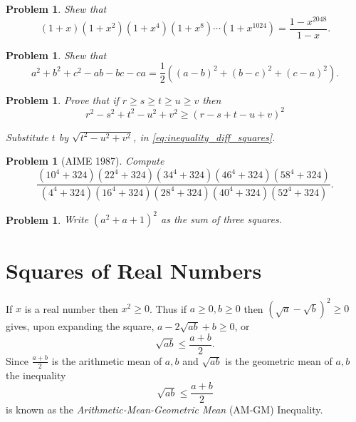 \documentclass[11pt, openany]{book}
\theoremstyle{change} \theoremheaderfont{\blue\sffamily\bfseries}
\newtheorem{pro}[thm]{Problem}
\theoremstyle{nonumberplain} \theoremheaderfont{\sffamily\bfseries}
\newcommand{\dis}{\displaystyle}
\newcommand{\í}{\'{\i}}
\begin{document}
\begin{multicols}{2}
\begin{pro} Shew that
$$(1 + x)(1 + x^2)(1 + x^4 )(1 + x^8)\cdots (1 + x^{1024}) = \frac{1 - x^{2048}}{1 - x}.$$
\end{pro}
\begin{pro}
Shew that
$$a^2 + b^2 + c^2 - ab - bc - ca = \frac{1}{2}\left((a - b)^2 + (b - c)^2 + (c - a)^2\right) .$$
\end{pro}
\begin{pro}
Prove that if $r \geq s \geq t \geq u \geq v$ then
\begin{equation}
r^2 - s^2 + t^2 - u^2 + v^2  \geq (r - s + t - u + v)^2
\end{equation}
\begin{answer}
Substitute $t$ by $\sqrt{t^2 - u^2 + v^2}$, in
\ref{eq:inequality_diff_squares}.
\end{answer}
\end{pro}

\begin{pro}[AIME 1987] Compute
$$\frac{(10^4 + 324)(22^4 + 324)(34^4 + 324)(46^4 + 324)(58^4 + 324)}{(4^4 + 324)(16^4 + 324)(28^4 + 324)
(40^4 + 324)(52^4 + 324)}.$$
\end{pro}
\begin{pro}Write $(a^2 + a + 1)^2$ as the sum of three squares.
\end{pro}\end{multicols}
\section{Squares of Real Numbers} If $x$ is a real
number then $x^2 \geq 0$. Thus if $a \geq 0, b \geq 0$ then
$(\sqrt{a} - \sqrt{b})^2 \geq 0$ gives, upon expanding the square,
$a - 2\sqrt{ab} + b \geq 0$, or
$$\sqrt{ab} \leq \frac{a + b}{2}.$$ Since $\dis{\frac{a + b}{2}}$ is the arithmetic mean of
$a, b$ and $\sqrt{ab}$ is the geometric mean of $a, b$ the
inequality
\begin{equation}
\sqrt{ab} \leq \frac{a + b}{2}
\end{equation} is known as the {\em Arithmetic-Mean-Geometric Mean} (AM-GM) Inequality.
\end{document}
